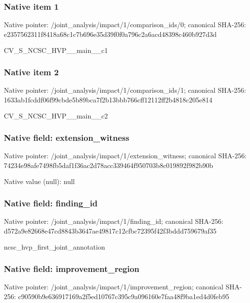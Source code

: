 \documentclass[10pt,a4paper]{article}
\begin{document}
\subsubsection{Native item 1}
Native pointer: /joint\_\allowbreak{}analysis/impact/1/comparison\_\allowbreak{}ids/0; canonical SHA-256: e2357562311f8418a68c1c7b696e35d39f0f0a796c2a6acd48398c460b927d3d

\begingroup\raggedright\sloppy CV\_\allowbreak{}S\_\allowbreak{}NCSC\_\allowbreak{}HVP\_\allowbreak{}\_\allowbreak{}main\_\allowbreak{}\_\allowbreak{}c1\par\endgroup

\subsubsection{Native item 2}
Native pointer: /joint\_\allowbreak{}analysis/impact/1/comparison\_\allowbreak{}ids/1; canonical SHA-256: 1633ab1fcddf06f99cbde5b89bca7f2b13bbb766cff12112ff2b4818c205e814

\begingroup\raggedright\sloppy CV\_\allowbreak{}S\_\allowbreak{}NCSC\_\allowbreak{}HVP\_\allowbreak{}\_\allowbreak{}main\_\allowbreak{}\_\allowbreak{}c2\par\endgroup

\subsubsection{Native field: extension\_\allowbreak{}witness}
Native pointer: /joint\_\allowbreak{}analysis/impact/1/extension\_\allowbreak{}witness; canonical SHA-256: 74234e98afe7498fb5daf1f36ac2d78acc339464f950703b8c019892f982b90b

Native value (null): null

\subsubsection{Native field: finding\_\allowbreak{}id}
Native pointer: /joint\_\allowbreak{}analysis/impact/1/finding\_\allowbreak{}id; canonical SHA-256: d572a9e82668e47cd8843b3647ae49817c12cfbc72395f42f3bddd759679af35

\begingroup\raggedright\sloppy ncsc\_\allowbreak{}hvp\_\allowbreak{}first\_\allowbreak{}joint\_\allowbreak{}annotation\par\endgroup

\subsubsection{Native field: improvement\_\allowbreak{}region}
Native pointer: /joint\_\allowbreak{}analysis/impact/1/improvement\_\allowbreak{}region; canonical SHA-256: c90590b9e636917169a2f5ed10767c395c9a096160e7faa48f9ba1ed4d0feb95
\end{document}
